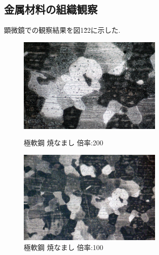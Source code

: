 \documentclass[10pt,a4j]{jsarticle}
\begin{document}
  \subsection{金属材料の組織観察}
  顕微鏡での観察結果を図1\~22に示した.
  \begin{figure}[htbp]  
    \begin{minipage}{0.5\hsize}
      \begin{center}
        \includegraphics[width=7cm]{../img/gokunankou_yakinamashi_200.png}
        \caption{極軟鋼 焼なまし 倍率:200}
      \end{center}
    \end{minipage}
    \begin{minipage}{0.5\hsize}
      \begin{center}
        \includegraphics[width=7cm]{../img/gokunankou_yakinamashi_100.png}
        \caption{極軟鋼 焼なまし 倍率:100}
      \end{center}
    \end{minipage}
  \end{figure}
\end{document}
